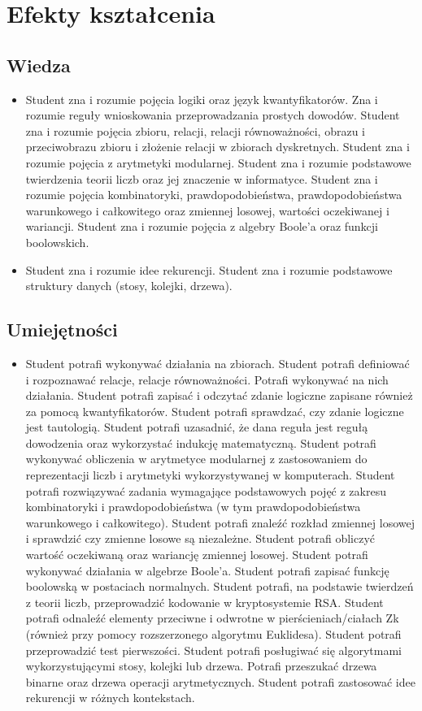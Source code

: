 \documentclass[12pt, a4paper]{article}
\begin{document}
\section{Efekty kształcenia}

\subsection*{Wiedza}
\begin{itemize}
  \item Student zna i rozumie pojęcia logiki oraz język kwantyfikatorów. Zna i rozumie reguły wnioskowania przeprowadzania prostych dowodów. Student zna i rozumie  pojęcia zbioru, relacji, relacji równoważności, obrazu i przeciwobrazu zbioru i złożenie relacji w zbiorach dyskretnych. Student zna i rozumie pojęcia z arytmetyki modularnej. Student zna i rozumie podstawowe twierdzenia teorii liczb oraz jej znaczenie w informatyce. Student zna i rozumie  pojęcia kombinatoryki, prawdopodobieństwa, prawdopodobieństwa warunkowego i całkowitego oraz zmiennej losowej, wartości oczekiwanej i wariancji. Student zna i rozumie  pojęcia z algebry Boole’a oraz funkcji boolowskich.
  \item Student zna i rozumie idee rekurencji. Student zna i rozumie podstawowe struktury danych (stosy, kolejki, drzewa).
\end{itemize}

\subsection*{Umiejętności}
\begin{itemize}
  \item Student potrafi wykonywać działania na zbiorach. Student potrafi definiować i rozpoznawać relacje, relacje równoważności. Potrafi wykonywać na nich działania. Student potrafi zapisać i odczytać zdanie logiczne zapisane również za pomocą kwantyfikatorów. Student potrafi sprawdzać, czy zdanie logiczne jest tautologią. Student potrafi uzasadnić, że dana reguła jest regułą dowodzenia oraz wykorzystać indukcję matematyczną. Student potrafi wykonywać obliczenia w arytmetyce modularnej z zastosowaniem do reprezentacji liczb i arytmetyki wykorzystywanej w komputerach. Student potrafi rozwiązywać zadania wymagające podstawowych pojęć z zakresu kombinatoryki i prawdopodobieństwa (w tym prawdopodobieństwa warunkowego i całkowitego). Student potrafi znaleźć rozkład zmiennej losowej i sprawdzić czy zmienne losowe są niezależne. Student potrafi obliczyć wartość oczekiwaną oraz wariancję zmiennej losowej. Student potrafi wykonywać działania w algebrze Boole’a. Student potrafi zapisać funkcję boolowską w postaciach normalnych.  Student potrafi, na podstawie twierdzeń z teorii liczb, przeprowadzić kodowanie w kryptosystemie RSA. Student potrafi odnaleźć elementy przeciwne i odwrotne w pierścieniach/ciałach Zk (również przy pomocy rozszerzonego algorytmu Euklidesa). Student potrafi przeprowadzić test pierwszości. Student potrafi posługiwać się algorytmami wykorzystującymi stosy, kolejki lub drzewa. Potrafi przeszukać drzewa binarne oraz drzewa operacji arytmetycznych. Student potrafi zastosować idee rekurencji w różnych kontekstach.
\end{itemize}
\end{document}
